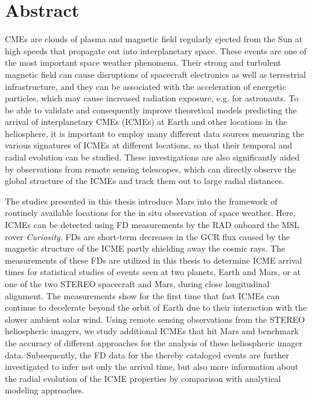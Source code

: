 \chapter*{Abstract}

\Acp{CME} are clouds of plasma and magnetic field regularly ejected from the Sun at high speeds that propagate out into interplanetary space. These events are one of the most important space weather phenomena.
Their strong and turbulent magnetic field can cause disruptions of spacecraft electronics as well as terrestrial infrastructure, and they can be associated with the acceleration of energetic particles, which may cause increased radiation exposure, e.g. for astronauts.
To be able to validate and consequently improve theoretical models predicting the arrival of interplanetary \acp{CME} (\acsp{ICME}) at Earth and other locations in the heliosphere, it is important to employ many different data sources measuring the various signatures of \acp{ICME} at different locations, so that their temporal and radial evolution can be studied. These investigations are also significantly aided by observations from remote sensing telescopes, which can directly observe the global structure of the \acp{ICME} and track them out to large radial distances.

The studies presented in this thesis introduce Mars into the framework of routinely available locations for the in situ observation of space weather. Here, \acp{ICME} can be detected using \acl{FD} measurements by the \ac{RAD} onboard the \acl{MSL} rover \textit{Curiosity}. \aclp{FD} are short-term decreases in the \acl{GCR} flux caused by the magnetic structure of the \ac{ICME} partly shielding away the cosmic rays.
The measurements of these \aclp{FD} are utilized in this thesis to determine \ac{ICME} arrival times for statistical studies of events seen at two planets, Earth and Mars, or at one of the two \acs{STEREO} spacecraft and Mars, during close longitudinal alignment.
The measurements show for the first time that fast \acp{ICME} can continue to decelerate beyond the orbit of Earth due to their interaction with the slower ambient solar wind.
Using remote sensing observations from the \acs{STEREO} heliospheric imagers, we study additional \acp{ICME} that hit Mars and benchmark the accuracy of different approaches for the analysis of these heliospheric imager data.
Subsequently, the \acl{FD} data for the thereby cataloged events are further investigated to infer not only the arrival time, but also more information about the radial evolution of the \ac{ICME} properties by comparison with analytical modeling approaches.

